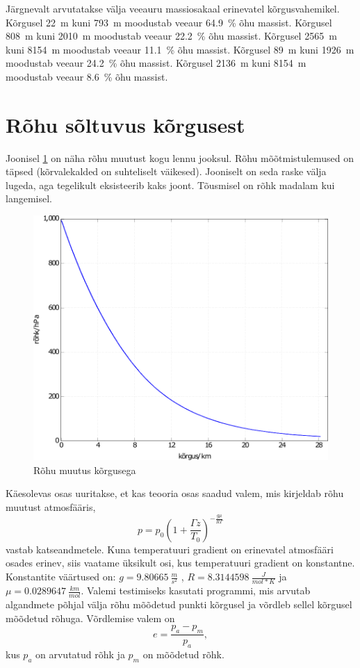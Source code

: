 \documentclass{trkut}%
\begin{document}
Järgnevalt arvutatakse välja veeauru massiosakaal erinevatel kõrgusvahemikel. Kõrgusel \SI{22}{m} kuni \SI{793}{m} moodustab veeaur \SI{64.9}{\percent} õhu massist. Kõrgusel \SI{808}{m} kuni \SI{2010}{m} moodustab veeaur \SI{22.2}{\percent} õhu massist. Kõrgusel \SI{2565}{m} kuni \SI{8154}{m} moodustab veeaur \SI{11.1}{\percent} õhu massist. Kõrgusel \SI{89}{m} kuni \SI{1926}{m} moodustab veeaur \SI{24.2}{\percent} õhu massist. Kõrgusel \SI{2136}{m} kuni \SI{8154}{m} moodustab veeaur \SI{8.6}{\percent} õhu massist.


\section{Rõhu sõltuvus kõrgusest}
Joonisel \ref{prekõrg} on näha rõhu muutust kogu lennu jooksul. Rõhu mõõtmistulemused on täpsed (kõrvalekalded on suhteliselt väikesed). Jooniselt on seda raske välja lugeda, aga tegelikult eksisteerib kaks joont. Tõusmisel on rõhk madalam kui langemisel.
\begin{figure}[h]
	\includegraphics[width=1\textwidth]{PicGra/prekõrg.pdf}
	\caption{Rõhu muutus kõrgusega}
	\label{prekõrg}%
\end{figure}

Käesolevas osas uuritakse, et kas teooria osas saadud valem, mis kirjeldab rõhu muutust atmosfääris,
\begin{equation}\label{eq14}
p = p_0 \left(1+\frac{\Gamma z}{T_0}\right)^{-\frac{g\mu}{R\Gamma}}
\end{equation}
vastab katseandmetele. Kuna temperatuuri gradient on erinevatel atmosfääri osades erinev, siis vaatame üksikult osi, kus temperatuuri gradient on konstantne. Konstantite väärtused on: $g = \SI{9.80665}{\frac{m}{s^2}}$ , $R = \SI{8.3144598}{\frac{J}{mol*K}}$ ja $\mu = \SI{0.0289647}{\frac{km}{mol}}$. Valemi testimiseks kasutati programmi, mis arvutab algandmete põhjal välja rõhu mõõdetud punkti kõrgusel ja võrdleb sellel kõrgusel mõõdetud rõhuga. Võrdlemise valem on
\begin{equation}
e = \frac{p_a-p_m}{p_a},
\end{equation}
kus $p_a$ on arvutatud rõhk ja $p_m$ on mõõdetud rõhk.
\end{document}
